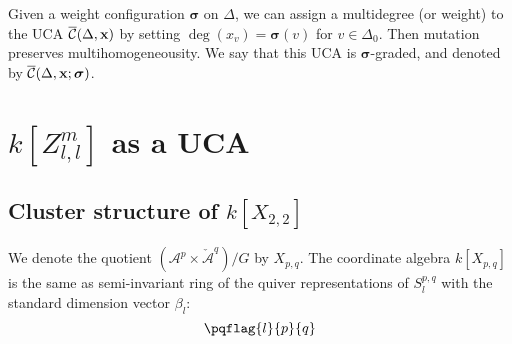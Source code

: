 \documentclass{amsart}
\theoremstyle{definition}
\theoremstyle{remark}
\numberwithin{equation}{section}
\newcommand{\mc}[1]{\mathcal{#1}}
\newcommand{\mch}[1]{\check{\mathcal{#1}}}
\renewcommand{\b}[1]{\bold{#1}}
\newcommand{\bs}[1]{\boldsymbol{#1}}
\newcommand{\br}[1]{\overline{#1}}
\newcommand{\g}{{\sf g}}
\newcommand{\uca}{\br{\mc{C}}}
\newcommand{\zllm}{{Z_{l,l}^m}}
\newcommand{\bl}{{\beta_l}}
\begin{document}
Given a weight configuration $\bs{\sigma}$ on $\Delta$,
we can assign a multidegree (or weight) to the UCA $\uca(\Delta,\b{x})$ by setting
$\deg(x_v)=\bs{\sigma}(v)$ for $v\in\Delta_0$.
Then mutation preserves multihomogeneousity.
We say that this UCA is $\bs{\sigma}$-graded, and denoted by $\uca(\Delta,\b{x};\bs{\sigma})$.


\section{$k[\zllm]$ as a UCA} \label{S:CSZ}

\subsection{Cluster structure of $k[X_{2,2}]$} \label{ss:X22}
We denote the quotient $(\mc{A}^p \times \mch{A}^q )/{G}$ by $X_{p,q}$.
The coordinate algebra $k[X_{p,q}]$ is the same as semi-invariant ring of the quiver representations of $S_l^{p,q}$ with the standard dimension vector $\bl$:
$$\pqflag{l}{p}{q}$$  
\end{document}
